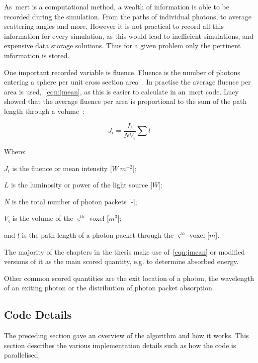 As~\gls*{mcrt} is a computational method, a wealth of information is able to be recorded during the simulation.
From the paths of individual photons, to average scattering angles and more.
However it is not practical to record all this information for every simulation, as this would lead to inefficient simulations, and expensive data storage solutions.
Thus for a given problem only the pertinent information is stored.

One important recorded variable is fluence.
Fluence is the number of photons entering a sphere per unit cross section area~\cite{rogers1990monte}.
In practise the average fluence per area is used,~\cref{eqn:jmean}, as this is easier to calculate in an~\gls*{mcrt} code.
Lucy showed that the average fluence per area is proportional to the sum of the path length through a volume~\cite{lucy1999computing}:

\begin{equation}
J_i = \frac{L}{NV_{\varsigma}}\sum l 
\label{eqn:jmean}
\end{equation}

\noindent Where:

\indent $J_i$ is the fluence or mean intensity [$W\ m^{-2}$];

\indent $L$ is the luminosity or power of the light source [$W$];

\indent $N$ is the total number of photon packets [-];

\indent $V_{\varsigma}$ is the volume of the $\varsigma^{th}$ voxel [$m^3$];

\indent and $l$ is the path length of a photon packet through the $\varsigma^{th}$ voxel [$m$]. 

\medskip

The majority of the chapters in the thesis make use of~\cref{eqn:jmean} or modified versions of it as the main scored quantity, e.g. to determine absorbed energy.

Other common scored quantities are the exit location of a photon, the wavelength of an exiting photon or the distribution of photon packet absorption.

\subsection{Code Details}

The preceding section gave an overview of the algorithm and how it works.
This section describes the various implementation details such as how the code is parallelised.

